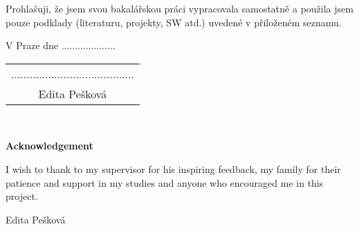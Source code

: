\documentclass[a4paper,12pt]{report}
\newcommand{\todo}
{{\it \color{magenta}
\ldots TODO \ldots
}}
\newcommand{\autor}{Edita Pešková}           %
\begin{document}
\vspace{0.5cm} %
Prohlašuji, že jsem svou bakalářskou práci vypracovala samostatně a použila jsem pouze podklady
(literaturu, projekty, SW atd.) uvedené v přiloženém seznamu.

\vspace{5mm}V Praze dne ....................\hfill   %
    \begin{tabular}{c}                               %
    ........................................\\       %
    \autor                                           %
    \end{tabular}                                    %



\newpage
\thispagestyle{empty}

~
\vfill %

{\bf Acknowledgement }

\vspace{5mm} %

I wish to thank to my supervisor for his inspiring feedback, my family for their patience and support in my studies and anyone who encouraged me in this project. 

\begin{flushright}
\autor
\end{flushright}  %



\newpage   %
\thispagestyle{empty}   %

\newbox\odstavecbox
\newlength\vyskaodstavce
\newcommand\odstavec[2]{%
    \setbox\odstavecbox=\hbox{%
         \parbox[t]{#1}{#2\vrule width 0pt depth 4pt}}%
    \global\vyskaodstavce=\dp\odstavecbox
    \box\odstavecbox}
\newcommand{\delka}{120mm} %
\end{document}
